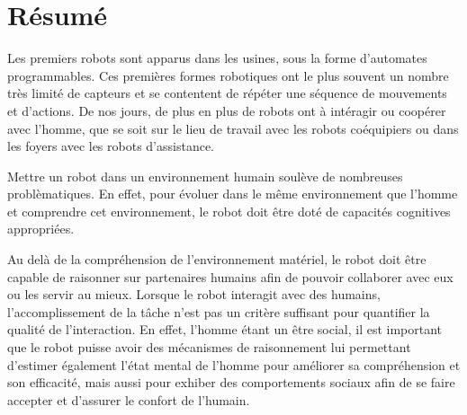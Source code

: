 \documentclass[a4paper,11pt,twoside]{StyleThese}
\begin{document}
\fi


\chapter*{Résumé}
Les premiers robots sont apparus dans les usines, sous la forme d'automates programmables. Ces premières formes robotiques ont le plus souvent un nombre très limité de capteurs et se contentent de répéter une séquence de mouvements et d'actions. De nos jours, de plus en plus de robots ont à intéragir ou coopérer avec l'homme, que se soit sur le lieu de travail avec les robots coéquipiers ou dans les foyers avec les robots d'assistance.

Mettre un robot dans un environnement humain soulève de nombreuses problèmatiques.
En effet, pour évoluer dans le même environnement que l'homme et comprendre cet environnement, le robot doit être doté de capacités cognitives appropriées.


Au delà de la compréhension de l'environnement matériel, le robot doit être capable de raisonner sur partenaires humains afin de pouvoir collaborer avec eux ou les servir au mieux. Lorsque le robot interagit avec des humains, l'accomplissement de la tâche n'est pas un critère suffisant pour quantifier la qualité de l'interaction. En effet, l'homme étant un être social, il est important que le robot puisse avoir des mécanismes de raisonnement lui permettant d'estimer également l'état mental de l'homme pour améliorer sa compréhension et son efficacité, mais aussi pour exhiber des comportements sociaux afin de se faire accepter et d'assurer le confort de l'humain.
\end{document}
